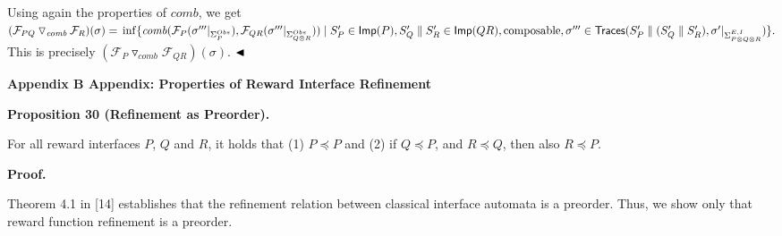 \documentclass[10pt,a4paper]{article}
\begin{document}
 
 
Using again the properties of $\mathit{comb}$, we get $({{\mathcal{F}_{PQ}}\mathbin{\triangledown_{\mathit{comb}}}{\mathcal{F}_{R}}})(\sigma)=\\
\inf\{\mathit{comb}(\mathcal{F}_{P}(\sigma^{\prime\prime\prime}|_{\Sigma_{P}^{Obs}}),\mathcal{F}_{QR}(\sigma^{\prime\prime\prime}|_{\Sigma_{Q\otimes R}^{Obs}}))\mid S^{\prime}_{P}\in\mathsf{Imp}(P),S^{\prime}_{Q}\parallel S^{\prime}_{R}\in\mathsf{Imp}(QR),\text{composable},\\
\sigma^{\prime\prime\prime}\in\mathsf{Traces}(S^{\prime}_{P}\parallel(S^{\prime}_{Q}\parallel S^{\prime}_{R}),\sigma^{\prime}|_{\Sigma_{P\otimes Q\otimes R}^{E,I}})\}.$ This is precisely $({{\mathcal{F}_{P}}\mathbin{\triangledown_{\mathit{comb}}}{\mathcal{F}_{QR}}})(\sigma)$. $\hfill\blacktriangleleft$\par
 
 
 


 
\par\medskip\noindent\textbf{Appendix B Appendix: Properties of Reward Interface Refinement}\par
 
 
\par\medskip\noindent\textbf{Proposition 30 (Refinement as Preorder).}\par
 
 
For all reward interfaces $P$, $Q$ and $R$, it holds that (1) $P\preceq P$ and (2) if $Q\preceq P$, and $R\preceq Q$, then also $R\preceq P$.\par
 
 
 
 
\par\medskip\noindent\textbf{Proof.}\par
 
 
Theorem 4.1 in [14] establishes that the refinement relation between classical interface automata is a preorder. Thus, we show only that reward function refinement is a preorder.\par
 
\end{document}
